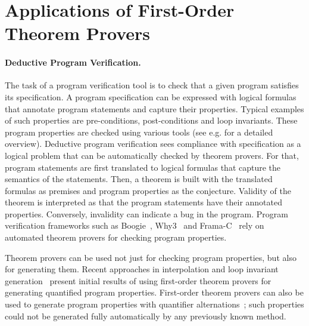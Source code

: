 \section*{Applications of First-Order Theorem Provers}

\paragraph{Deductive Program Verification.}
The task of a program verification tool is to check that a given program satisfies its specification. A program specification can be expressed with logical formulas that annotate program statements and capture their properties. Typical examples of such properties are pre-conditions, post-conditions and loop invariants. These program properties are checked using various tools (see e.g. \cite{Bonacina10} for a detailed overview). Deductive program verification sees compliance with specification as a logical problem that can be automatically checked by theorem provers. For that, program statements are first translated to logical formulas that capture the semantics of the statements. Then, a theorem is built with the translated formulas as premises and program properties as the conjecture. Validity of the theorem is interpreted as that the program statements have their annotated properties. Conversely, invalidity can indicate a bug in the program. Program verification frameworks such as Boogie~\cite{DBLP:conf/fmco/BarnettCDJL05}, Why3~\cite{DBLP:conf/esop/FilliatreP13} and Frama-C~\cite{FramaC} rely on automated theorem provers for checking program properties.

Theorem provers can be used not just for checking program properties, but also for generating them. Recent approaches in interpolation and loop invariant generation~\cite{McMillan08,fase2009,hoder2012popl} present initial results of using first-order theorem provers for generating quantified program properties. First-order theorem provers can also be used to generate program properties with quantifier alternations~\cite{fase2009}; such properties could not be generated fully automatically by any previously known method.


